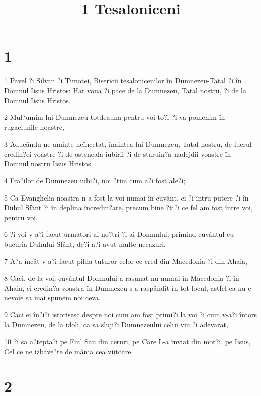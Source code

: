 

\title{1 Tesaloniceni}


\chapter{1}

\par 1 Pavel ?i Silvan ?i Timotei, Bisericii tesalonicenilor în Dumnezeu-Tatal ?i în Domnul Iisus Hristos: Har voua ?i pace de la Dumnezeu, Tatal nostru, ?i de la Domnul Iisus Hristos.
\par 2 Mul?umim lui Dumnezeu totdeauna pentru voi to?i ?i va pomenim în rugaciunile noastre,
\par 3 Aducându-ne aminte neîncetat, înaintea lui Dumnezeu, Tatal nostru, de lucrul credin?ei voastre ?i de osteneala iubirii ?i de staruin?a nadejdii voastre în Domnul nostru Iisus Hristos.
\par 4 Fra?ilor de Dumnezeu iubi?i, noi ?tim cum a?i fost ale?i;
\par 5 Ca Evanghelia noastra n-a fost la voi numai în cuvânt, ci ?i întru putere ?i în Duhul Sfânt ?i în deplina încredin?are, precum bine ?ti?i ce fel am fost între voi, pentru voi.
\par 6 ?i voi v-a?i facut urmatori ai no?tri ?i ai Domnului, primind cuvântul cu bucuria Duhului Sfânt, de?i a?i avut multe necazuri.
\par 7 A?a încât v-a?i facut pilda tuturor celor ce cred din Macedonia ?i din Ahaia,
\par 8 Caci, de la voi, cuvântul Domnului a rasunat nu numai în Macedonia ?i în Ahaia, ci credin?a voastra în Dumnezeu s-a raspândit în tot locul, astfel ca nu e nevoie sa mai spunem noi ceva.
\par 9 Caci ei în?i?i istorisesc despre noi cum am fost primi?i la voi ?i cum v-a?i întors la Dumnezeu, de la idoli, ca sa sluji?i Dumnezeului celui viu ?i adevarat,
\par 10 ?i sa a?tepta?i pe Fiul Sau din ceruri, pe Care L-a înviat din mor?i, pe Iisus, Cel ce ne izbave?te de mânia cea viitoare.

\chapter{2}


